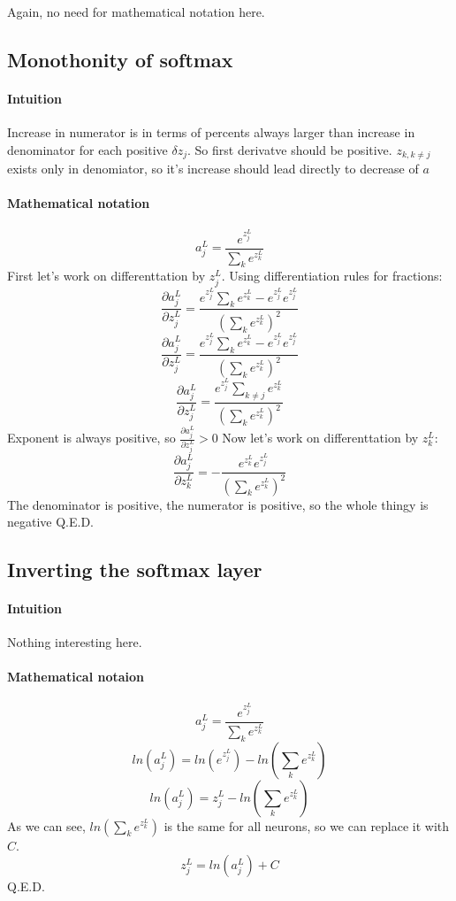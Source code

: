 \documentclass{article}
\begin{document}
Again, no need for mathematical notation here.

\subsection{Monothonity of softmax}
\paragraph{Intuition}
Increase in numerator is in terms of percents always larger than increase in denominator for each positive $\delta z_j$.
So first derivatve should be positive. 
$z_{k, k \neq j}$ exists only in denomiator, so it's increase should lead directly to decrease of $a$
\paragraph{Mathematical notation}
$$a^L_j = \frac{e^{z^L_j}}{\sum_{k} e^{z^L_k}}$$
First let's work on differenttation by $z^L_j$.
Using differentiation rules for fractions:
$$\frac{\partial a^L_j}{\partial z^L_j} = \frac{e^{z^L_j} \sum_{k} e^{z^L_k} - e^{z^L_j} e^{z^L_j}}{(\sum_{k} e^{z^L_k})^2}$$
$$\frac{\partial a^L_j}{\partial z^L_j} = \frac{e^{z^L_j} \sum_{k} e^{z^L_k} - e^{z^L_j} e^{z^L_j}}{(\sum_{k} e^{z^L_k})^2}$$
$$\frac{\partial a^L_j}{\partial z^L_j} = \frac{e^{z^L_j} \sum_{k \neq j} e^{z^L_k}}{(\sum_{k} e^{z^L_k})^2}$$
Exponent is always positive, so $\frac{\partial a^L_j}{\partial z^L_j} > 0$
Now let's work on differenttation by $z^L_k$:
$$\frac{\partial a^L_j}{\partial z^L_k} = -\frac{e^{z^L_k} e^{z^L_j}}{(\sum_{k} e^{z^L_k})^2}$$
The denominator is positive, the numerator is positive, so the whole thingy is negative
Q.E.D.

\subsection{Inverting the softmax layer}
\paragraph{Intuition}
Nothing interesting here.
\paragraph{Mathematical notaion}
$$a^L_j = \frac{e^{z^L_j}}{\sum_{k} e^{z^L_k}}$$
$$ln(a^L_j) = ln(e^{z^L_j}) - ln(\sum_{k}e^{z^L_k})$$
$$ln(a^L_j) = z^L_j - ln(\sum_{k}e^{z^L_k})$$
As we can see, $ln(\sum_{k}e^{z^L_k})$ is the same for all neurons, so we can replace it with $C$.
$$z^L_j = ln(a^L_j) + C$$
Q.E.D.
\end{document}
